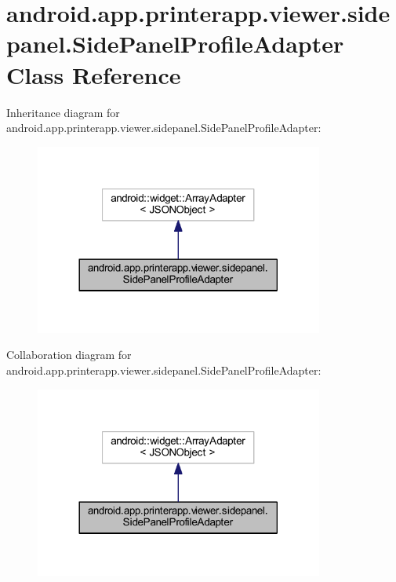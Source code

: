 \hypertarget{classandroid_1_1app_1_1printerapp_1_1viewer_1_1sidepanel_1_1_side_panel_profile_adapter}{}\section{android.\+app.\+printerapp.\+viewer.\+sidepanel.\+Side\+Panel\+Profile\+Adapter Class Reference}
\label{classandroid_1_1app_1_1printerapp_1_1viewer_1_1sidepanel_1_1_side_panel_profile_adapter}


Inheritance diagram for android.\+app.\+printerapp.\+viewer.\+sidepanel.\+Side\+Panel\+Profile\+Adapter\+:
\nopagebreak
\begin{figure}[H]
\begin{center}
\leavevmode
\includegraphics[width=269pt]{classandroid_1_1app_1_1printerapp_1_1viewer_1_1sidepanel_1_1_side_panel_profile_adapter__inherit__graph}
\end{center}
\end{figure}


Collaboration diagram for android.\+app.\+printerapp.\+viewer.\+sidepanel.\+Side\+Panel\+Profile\+Adapter\+:
\nopagebreak
\begin{figure}[H]
\begin{center}
\leavevmode
\includegraphics[width=269pt]{classandroid_1_1app_1_1printerapp_1_1viewer_1_1sidepanel_1_1_side_panel_profile_adapter__coll__graph}
\end{center}
\end{figure}

